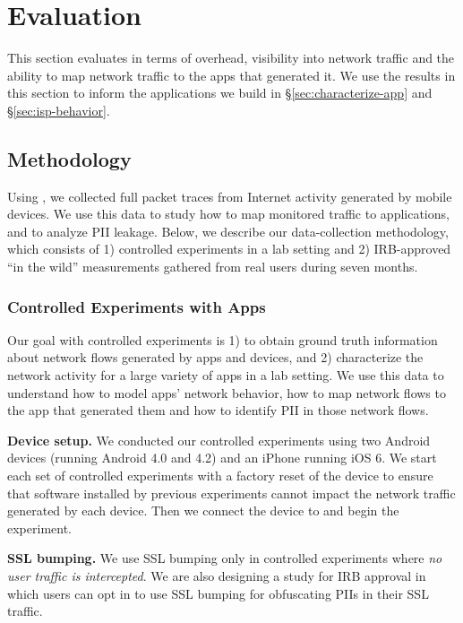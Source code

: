 
\section{Evaluation}
\label{sec:eval}
This section evaluates \meddle in terms of overhead, visibility into network traffic and 
the ability to map network traffic to the apps that generated it. We use the results in 
this section to inform the applications we build in \S\ref{sec:characterize-app} and \S\ref{sec:isp-behavior}.

\subsection{Methodology}
\label{sec:dataset}
Using \platname, we collected full packet traces from Internet activity generated by
mobile devices. We use this data to study how to map monitored traffic to applications, and to
analyze PII leakage. Below, we describe our data-collection methodology, which consists of
1) controlled experiments in a lab setting and 2) IRB-approved ``in the wild'' measurements 
gathered from real users during seven months.


\subsubsection{Controlled Experiments with Apps}
\label{sec:dataset-contr-exper}
Our goal with controlled experiments is 1) to obtain ground truth information 
about network flows generated by apps and devices, and 2) characterize the 
network activity for a large variety of apps in a lab setting. We use 
this data to understand how to model apps' network behavior, how to map network flows 
to the app that generated them and how to identify PII in those network flows. 

\noindent\textbf{Device setup.} We conducted our controlled experiments using two Android 
devices (running Android 4.0 and 4.2) and an iPhone running iOS 6. We start each set of controlled experiments
 with a factory reset of the device to ensure that software installed by previous 
 experiments cannot impact the network traffic generated by each device. 
 Then we connect the device to \platname{}  and begin
the experiment. 


\noindent\textbf{SSL bumping.} 
We use SSL bumping only in controlled experiments where \emph{no user traffic is intercepted}.
We are also designing a study for IRB approval in which users can opt in to use SSL bumping for obfuscating PIIs in their SSL traffic.


